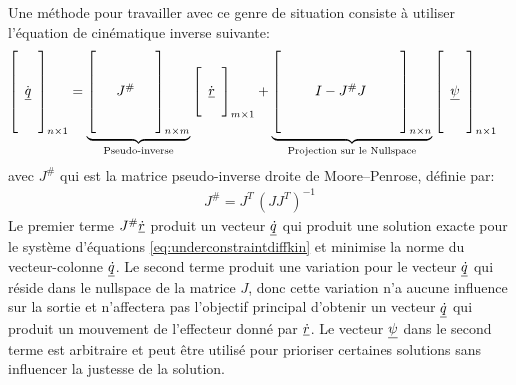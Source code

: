 Une méthode pour travailler avec ce genre de situation consiste à utiliser l'équation de cinématique inverse suivante:
\begin{align}
	\left[ \begin{array}{c}  \\ \\ \dot{\underline{q}} \\ \\ \\
	\end{array} \right]_{n \times 1}
	&=
	\underbrace{
		\left[ \begin{array}{c c c}
				   &&\\ &&\\ & J^{\#} & \\&& \\ &&
		\end{array} \right]_{n \times m}
	}_{\text{Pseudo-inverse}}
	\left[ \begin{array}{c}
			   \\ \dot{\underline{r}} \\ \\
	\end{array} \right]_{m \times 1} +
	\underbrace{
		\left[ \begin{array}{c c c c c}
				   &&&&\\ &&&&\\ && I - J^{\#}J && \\&&&& \\ &&&&
		\end{array} \right]_{n \times n}
	}_{\text{Projection sur le Nullspace}}
	\left[ \begin{array}{c}
			   \\ \\ \underline{\psi} \\ \\ \\
	\end{array} \right]_{n \times 1}
	\label{eq:pseudoinversediffkin}
\end{align}
avec $J^{\#}$ qui est la matrice pseudo-inverse droite de Moore–Penrose, définie par:
\begin{align}
	J^{\#} = J^T\, (JJ^T)^{-1}
\end{align}
Le premier terme $J^{\#} \underline{\dot{r}}$ produit un vecteur $\underline{\dot{q}}$ qui produit une solution exacte pour le système d'équations \eqref{eq:underconstraintdiffkin}
et minimise la norme du vecteur-colonne $\underline{\dot{q}}$. Le second terme produit une variation pour le vecteur $\underline{\dot{q}}$ qui réside dans le nullspace de la matrice $J$, donc cette variation n'a aucune influence sur la sortie et n’affectera pas l'objectif principal d'obtenir un vecteur $\underline{\dot{q}}$ qui produit un mouvement de l'effecteur donné par $\underline{\dot{r}}$. Le vecteur $\underline{\psi}$ dans le second terme est arbitraire et peut être utilisé pour prioriser certaines solutions sans influencer la justesse de la solution.


